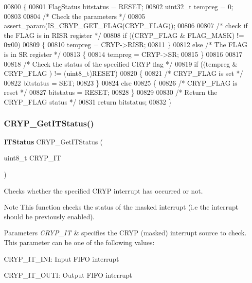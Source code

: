 \begin{DoxyCode}
00800 \{
00801   FlagStatus bitstatus = RESET;
00802   uint32\_t tempreg = 0;
00803 
00804   \textcolor{comment}{/* Check the parameters */}
00805   assert_param(IS_CRYP_GET_FLAG(CRYP\_FLAG));
00806 
00807   \textcolor{comment}{/* check if the FLAG is in RISR register */}
00808   \textcolor{keywordflow}{if} ((CRYP\_FLAG & FLAG_MASK) != 0x00) 
00809   \{
00810     tempreg = CRYP->RISR;
00811   \}
00812   \textcolor{keywordflow}{else}  \textcolor{comment}{/* The FLAG is in SR register */}
00813   \{
00814     tempreg = CRYP->SR;
00815   \}
00816 
00817 
00818   \textcolor{comment}{/* Check the status of the specified CRYP flag */}
00819   \textcolor{keywordflow}{if} ((tempreg & CRYP\_FLAG ) != (uint8\_t)RESET)
00820   \{
00821     \textcolor{comment}{/* CRYP\_FLAG is set */}
00822     bitstatus = SET;
00823   \}
00824   \textcolor{keywordflow}{else}
00825   \{
00826     \textcolor{comment}{/* CRYP\_FLAG is reset */}
00827     bitstatus = RESET;
00828   \}
00829 
00830   \textcolor{comment}{/* Return the CRYP\_FLAG status */}
00831   \textcolor{keywordflow}{return}  bitstatus;
00832 \}
\end{DoxyCode}
\mbox{\label{group__CRYP__Group5_ga00a48b748ed127fa517cacec9dbf18f4}} 
\subsubsection{C\+R\+Y\+P\+\_\+\+Get\+I\+T\+Status()}
{\footnotesize\ttfamily \textbf{ I\+T\+Status} C\+R\+Y\+P\+\_\+\+Get\+I\+T\+Status (\begin{DoxyParamCaption}\item[{uint8\+\_\+t}]{C\+R\+Y\+P\+\_\+\+IT }\end{DoxyParamCaption})}



Checks whether the specified C\+R\+YP interrupt has occurred or not. 

\begin{DoxyNote}{Note}
This function checks the status of the masked interrupt (i.\+e the interrupt should be previously enabled). 
\end{DoxyNote}

\begin{DoxyParams}{Parameters}
{\em C\+R\+Y\+P\+\_\+\+IT} & specifies the C\+R\+YP (masked) interrupt source to check. This parameter can be one of the following values\+: \begin{DoxyItemize}
\item C\+R\+Y\+P\+\_\+\+I\+T\+\_\+\+I\+NI\+: Input F\+I\+FO interrupt \item C\+R\+Y\+P\+\_\+\+I\+T\+\_\+\+O\+U\+TI\+: Output F\+I\+FO interrupt \end{DoxyItemize}
\\
\hline
\end{DoxyParams}


